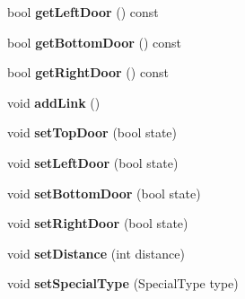 \begin{DoxyCompactItemize}
\item 
\hypertarget{class_room_a3b86ce135752e252c7f2900f29abbb6f}{bool {\bfseries get\+Left\+Door} () const }\label{class_room_a3b86ce135752e252c7f2900f29abbb6f}

\item 
\hypertarget{class_room_acb8b99c54a262c532a2b4f388fafc36a}{bool {\bfseries get\+Bottom\+Door} () const }\label{class_room_acb8b99c54a262c532a2b4f388fafc36a}

\item 
\hypertarget{class_room_a257c82e3ac31634b8612c33900fc28bc}{bool {\bfseries get\+Right\+Door} () const }\label{class_room_a257c82e3ac31634b8612c33900fc28bc}

\item 
\hypertarget{class_room_ab9ce2180afaa86a1881a245d1b539e03}{void {\bfseries add\+Link} ()}\label{class_room_ab9ce2180afaa86a1881a245d1b539e03}

\item 
\hypertarget{class_room_a6918ec80b6c291bbce3a9f8d8889222f}{void {\bfseries set\+Top\+Door} (bool state)}\label{class_room_a6918ec80b6c291bbce3a9f8d8889222f}

\item 
\hypertarget{class_room_afe6694b78ba1754048dcba4e6036c9a5}{void {\bfseries set\+Left\+Door} (bool state)}\label{class_room_afe6694b78ba1754048dcba4e6036c9a5}

\item 
\hypertarget{class_room_a6bd75cbe373514583b67b6131e484814}{void {\bfseries set\+Bottom\+Door} (bool state)}\label{class_room_a6bd75cbe373514583b67b6131e484814}

\item 
\hypertarget{class_room_a5ba5a9b9807f26d2ea17c8b9377214af}{void {\bfseries set\+Right\+Door} (bool state)}\label{class_room_a5ba5a9b9807f26d2ea17c8b9377214af}

\item 
\hypertarget{class_room_a8515625370a9aec953f76efded718e4b}{void {\bfseries set\+Distance} (int distance)}\label{class_room_a8515625370a9aec953f76efded718e4b}

\item 
\hypertarget{class_room_a5c58b28fceef732f7cf3f865209ab847}{void {\bfseries set\+Special\+Type} (Special\+Type type)}\label{class_room_a5c58b28fceef732f7cf3f865209ab847}

\end{DoxyCompactItemize}


